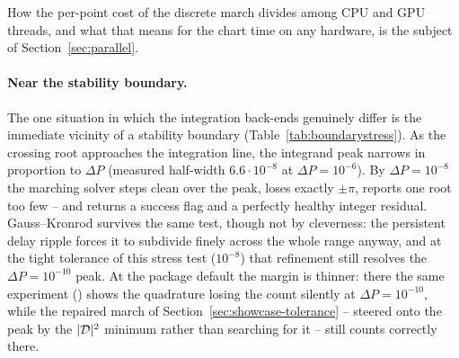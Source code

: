 How the per-point cost of the discrete march divides among CPU and GPU threads,
and what that means for the chart time on any hardware, is the subject of
Section~\ref{sec:parallel}.

\begin{table}[tb]
  \centering
  \caption{Approaching a Hopf boundary of the showcase system at distance
  $\Delta P$ in the gain. The peak half-width equals the distance of the
  crossing root from the axis, proportional to $\Delta P$
  ($6.6\cdot10^{-4}\,\Delta P/10^{-2}$); the tracked estimate $\sest$
  reproduces it down to $\Delta P=10^{-6}$, while in the last two rows it is
  limited by the step of the march (Section~\ref{sec:tracking}) and only its
  sign -- a root right of the axis -- remains correct. The marching
  solver silently loses one root once the peak falls below its step
  resolution, while the integer residual stays small
  ($\Zraw$ shifts by exactly one).}\label{tab:boundarystress}
\end{table}

\paragraph{Near the stability boundary.} The one situation in which the integration back-ends genuinely differ is the immediate
vicinity of a stability boundary (Table~\ref{tab:boundarystress}). As the
crossing root approaches the integration line, the integrand peak narrows
in proportion to $\Delta P$ (measured half-width $6.6\cdot10^{-8}$ at
$\Delta P=10^{-6}$). By $\Delta P=10^{-8}$ the marching solver steps clean
over the peak, loses exactly $\pm\pi$, reports one root too few -- and
returns a success flag and a perfectly healthy integer residual.
Gauss--Kronrod survives the same test, though not by cleverness: the
persistent delay ripple forces it to subdivide finely across the whole
range anyway, and at the tight tolerance of this stress test ($10^{-8}$)
that refinement still resolves the $\Delta P=10^{-10}$ peak. At the package
default the margin is thinner: there the same experiment
() shows the quadrature losing the count
silently at $\Delta P=10^{-10}$, while the repaired march of
Section~\ref{sec:showcase-tolerance} -- steered onto the peak by the
$|\mathcal{D}|^{2}$ minimum rather than searching for it -- still counts
correctly there.

